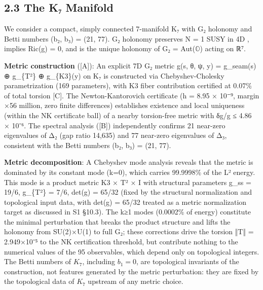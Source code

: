 \documentclass[11pt,a4paper]{article}
\begin{document}
\subsection{2.3 The K₇ Manifold}\label{the-kux2087-manifold}

We consider a compact, simply connected 7-manifold K₇ with G₂ holonomy and Betti numbers (b₂, b₃) = (21, 77). G₂ holonomy preserves N = 1 SUSY in 4D \cite{11}, implies Ric(g) = 0, and is the unique holonomy of G₂ = Aut(\ensuremath{\mathbb{O}}) acting on ℝ⁷.

\textbf{Metric construction} ({[}A{]}): An explicit 7D G₂ metric g(s, θ, ψ, y) = g\_\allowbreak{}seam(s) ⊕ g\_\allowbreak{}\{T²\} ⊕ g\_\allowbreak{}\{K3\}(y) on K₇ is constructed via Chebyshev-Cholesky parametrization (169 parameters), with K3 fiber contribution certified at 0.07\% of total torsion {[}C{]}. The Newton-Kantorovich certificate (h = 8.95 × 10⁻⁹, margin ×56 million, zero finite differences) establishes existence and local uniqueness (within the NK certificate ball) of a nearby torsion-free metric with δg/g ≤ 4.86 × 10⁻⁶. The spectral analysis ({[}B{]}) independently confirms 21 near-zero eigenvalues of Δ₂ (gap ratio 14,635) and 77 near-zero eigenvalues of Δ₃, consistent with the Betti numbers (b₂, b₃) = (21, 77).

\textbf{Metric decomposition}: A Chebyshev mode analysis reveals that the metric is dominated by its constant mode (k=0), which carries 99.9998\% of the L² energy. This mode is a product metric K3 × T² × I with structural parameters g\_\allowbreak{}ss = 19/6, g\_\allowbreak{}\{T²\} = 7/6, det(g) = 65/32 (fixed by the structural normalization and topological input data, with det(g) = 65/32 treated as a metric normalization target as discussed in S1 §10.3). The k≥1 modes (0.0002\% of energy) constitute the minimal perturbation that breaks the product structure and lifts the holonomy from SU(2)×U(1) to full G₂; these corrections drive the torsion ‖T‖ = 2.949×10⁻⁵ to the NK certification threshold, but contribute nothing to the numerical values of the 95 observables, which depend only on topological integers. The Betti numbers of \(K_7\), including \(b_1 = 0\), are topological invariants of the construction, not features generated by the metric perturbation: they are fixed by the topological data of \(K_7\) upstream of any metric choice.
\end{document}
